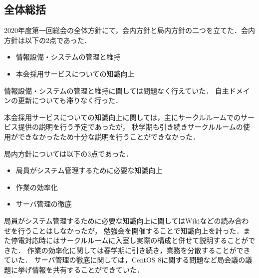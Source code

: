 \subsection*{全体総括}


2020年度第一回総会の全体方針にて，会内方針と局内方針の二つを立てた．会内方針は以下の2点であった．
\begin{itemize}
    \item 情報設備・システムの管理と維持
    \item 本会採用サービスについての知識向上
  \end{itemize}

情報設備・システムの管理と維持に関しては問題なく行えていた．
自主ドメインの更新についても滞りなく行った．

本会採用サービスについての知識向上に関しては，主にサークルルームでのサービス提供の説明を行う予定であったが，
秋学期も引き続きサークルルームの使用ができなかったため十分な説明を行うことができなかった．

局内方針については以下の3点であった．
\begin{itemize}
    \item 局員がシステム管理するために必要な知識向上
    \item 作業の効率化
    \item サーバ管理の徹底
\end{itemize}

局員がシステム管理するために必要な知識向上に関してはWikiなどの読み合わせを行うことはしなかったが，
勉強会を開催することで知識向上を計った．また停電対応時にはサークルルームに入室し実際の構成と併せて説明することができた．
作業の効率化に関しては春学期に引き続き，業務を分散することができていた．
サーバ管理の徹底に関しては，CentOS 8に関する問題など局会議の議題に挙げ情報を共有することができていた．
